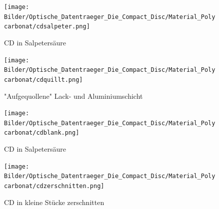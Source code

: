 \begin{figure}[h]
    \begin{center}
        \begin{minipage}[t]{0.4\textwidth}
            \begin{center}
                \texttt{[image: Bilder/Optische\_Datentraeger\_Die\_Compact\_Disc/Material\_Polycarbonat/cdsalpeter.png]}
                \caption[CD in Salpetersäure]{CD in Salpetersäure}
                \label{fig:cdsalpeter}
            \end{center}
        \end{minipage}
        \hspace{0.025\textwidth}
        \begin{minipage}[t]{0.4\textwidth}
            \begin{center}
                \texttt{[image: Bilder/Optische\_Datentraeger\_Die\_Compact\_Disc/Material\_Polycarbonat/cdquillt.png]}
                \caption["Aufgequollene" Lack- und Aluminiumschicht]{"Aufgequollene" Lack- und Aluminiumschicht}
                \label{fig:cdquillt}
            \end{center}
        \end{minipage}
    \end{center}

    \begin{center}
        \begin{minipage}[t]{0.4\textwidth}
            \begin{center}
                \texttt{[image: Bilder/Optische\_Datentraeger\_Die\_Compact\_Disc/Material\_Polycarbonat/cdblank.png]}
                \caption[CD in Salpetersäure]{CD in Salpetersäure}
                \label{fig:cdblank}
            \end{center}
        \end{minipage}
        \hspace{0.025\textwidth}
        \begin{minipage}[t]{0.4\textwidth}
            \begin{center}
                \texttt{[image: Bilder/Optische\_Datentraeger\_Die\_Compact\_Disc/Material\_Polycarbonat/cdzerschnitten.png]}
                \caption[CD in kleine Stücke zerschnitten]{CD in kleine Stücke zerschnitten}
                \label{fig:cdzerschnitten}
            \end{center}
        \end{minipage}
    \end{center}
\end{figure}

